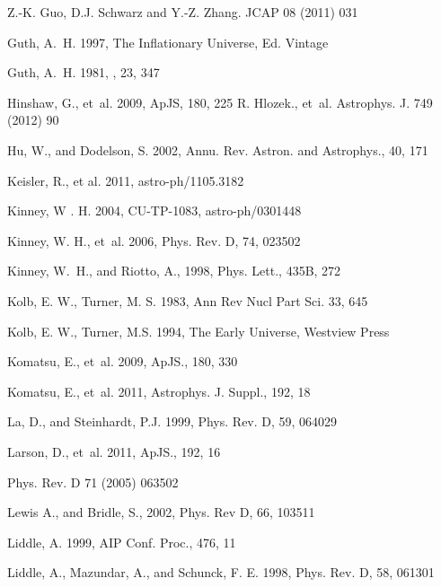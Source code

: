 \documentclass{rmaa}
\begin{document}
\begin{thebibliography}
Z.-K. Guo, D.J. Schwarz and Y.-Z. Zhang. JCAP 08 (2011) 031

Guth, A.~H. 1997, The Inflationary Universe,  Ed. Vintage
        
Guth, A.~H. 1981, \prd, 23,  347 

 
 
Hinshaw, G., et~al. 2009, ApJS, 180, 225
R. Hlozek., et~al. Astrophys. J. 749 (2012) 90

Hu, W., and {Dodelson,} S. 2002, Annu. Rev. Astron. and Astrophys., 40, 171

  Keisler, R., et al. 2011, astro-ph/1105.3182  
 
  Kinney, W . H. 2004, CU-TP-1083, astro-ph/0301448
 
 Kinney, W. H.,  et~al. 2006, Phys. Rev. D, 74, 023502

 Kinney, W.~H., and {Riotto}, A.,  1998, Phys. Lett., 435B, 272

Kolb, E. W., Turner, M. S. 1983, Ann Rev Nucl Part Sci. 33, 645
  
Kolb, E. W., Turner, M.S. 1994, The Early Universe, Westview Press  

  Komatsu, E., et~al. 2009, ApJS., 180, 330 
  
Komatsu, E., et~al. 2011, Astrophys. J. Suppl., 192, 18

  La, D., and {Steinhardt}, P.J.  1999, Phys. Rev. D, 59, 064029
 
Larson, D., et~al. 2011, ApJS., 192, 16

 Phys. Rev. D 71 (2005) 063502

Lewis A., and Bridle, S., 2002, Phys. Rev D, 66, 103511 
   
  Liddle, A. 1999, AIP Conf. Proc., 476, 11

 Liddle, A.,  {Mazundar,} A., and {Schunck,} F. E. 1998, Phys. Rev. D, 58, 061301  


\end{thebibliography}
\end{document}
